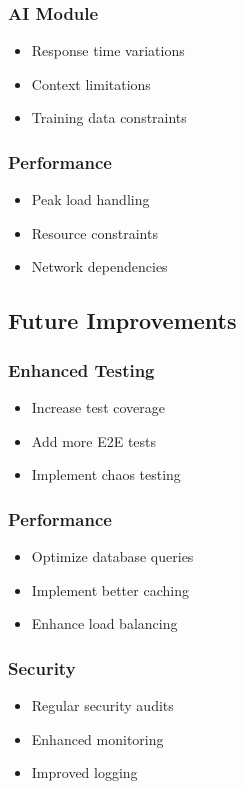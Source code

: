 \subsubsection{AI Module}
\begin{itemize}
    \item Response time variations
    \item Context limitations
    \item Training data constraints
\end{itemize}

\subsubsection{Performance}
\begin{itemize}
    \item Peak load handling
    \item Resource constraints
    \item Network dependencies
\end{itemize}

\subsection{Future Improvements}

\subsubsection{Enhanced Testing}
\begin{itemize}
    \item Increase test coverage
    \item Add more E2E tests
    \item Implement chaos testing
\end{itemize}

\subsubsection{Performance}
\begin{itemize}
    \item Optimize database queries
    \item Implement better caching
    \item Enhance load balancing
\end{itemize}

\subsubsection{Security}
\begin{itemize}
    \item Regular security audits
    \item Enhanced monitoring
    \item Improved logging
\end{itemize}

